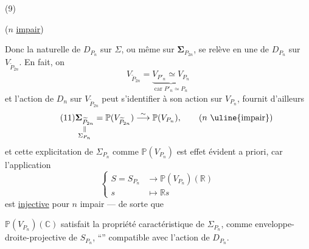 (9)

($n$ \uline{impair})

Donc la   naturelle de $D_{P_n}$ sur $\Sigma$, ou même sur $\boldsymbol\Sigma_{P_{2n}}$,  se relève en une   de $D_{P_n}$ sur $V_{\widetilde P_{2n}}$. En fait, on  
\[
\tag{10}
V_{\widetilde P_{2n}}=\underbrace{V_{P'_n}\simeq V_{P_n}}_{\text{car }P'_n\simeq P_n}
\]
et l'action de $D_n$ sur $V_{\widetilde P_{2n}}$ peut s'identifier à son action sur $V_{P_n}$,
 fournit d'ailleurs
\[
\tag{11}
\underset{\substack{\Vert\\\Sigma_{P_n}}}{\boldsymbol\Sigma_{\widetilde P_{2n}}}
=\mathbb P(V_{\widetilde P_{2n}})\overset\sim\longrightarrow\mathbb P(V_{P_n}),
\qquad(n\ \text{\uline{impair}})
\]
 et cette explicitation de $\Sigma_{P_n}$ comme $\mathbb P(V_{P_n})$ est  effet évident a priori, car l'application
\[
\left\{
\begin{aligned}
S=S_{P_n}&\longrightarrow\mathbb P(V_{P_n})(\mathbb R)\\
s&\longmapsto\mathbb R s
\end{aligned}
\right.
\]
est \uline{injective} pour $n$ impair — de sorte que

$\mathbb P(V_{P_n})(\mathbb C)$ satisfait  la propriété caractéristique de $\Sigma_{P_n}$, comme enveloppe-droite-projective de  $S_{P_n}$, ``'' compatible avec l'action de $D_{P_n}$.

